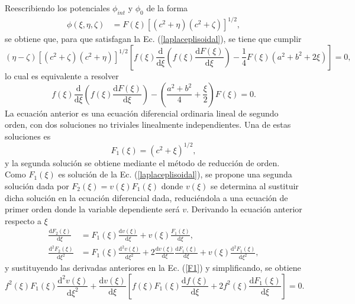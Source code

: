 Reescribiendo los potenciales $\phi_{int}$ y $\phi_0$ de la forma
\begin{align}
    \phi(\xi,\eta,\zeta)&=F(\xi)[(c^2+\eta)(c^2+\zeta)]^{1/2}, 
    \label{phi0 con F}
\end{align}
se obtiene que, para que satisfagan la Ec. (\ref{laplaceplisoidal}), se tiene que cumplir 
\begin{equation}
  (\eta-\zeta)[(c^2+\zeta)(c^2+\eta)]^{1/2}\left[f(\xi)\frac{\text{d}}{\text{d}\xi}\left(f(\xi)\frac{ \text{d} F(\xi)}{\text{d}\xi}\right)-\frac{1}{4}F(\xi)(a^2+b^2+2\xi)\right]=0,
\end{equation}
lo cual es equivalente a resolver
\begin{equation}
    f(\xi)\frac{\text{d}}{\text{d}\xi}\left(f(\xi)\frac{ \text{d} F(\xi)}{\text{d}\xi}\right)-\left(\frac{a^2+b^2}{4}+\frac{\xi}{2}\right)F(\xi)=0.
    \label{ecsimpli}
\end{equation}
La ecuación anterior es una ecuación diferencial ordinaria lineal de segundo orden, con dos soluciones no triviales linealmente independientes. Una de estas soluciones es
\begin{equation}
    F_1(\xi)=(c^2+\xi)^{1/2},
    \label{F1}
\end{equation}
y la segunda solución se obtiene mediante el método de reducción de orden. Como $F_1(\xi)$ es solución de la Ec. (\ref{laplaceplisoidal}), se propone una segunda solución dada por $F_2(\xi)=v(\xi)F_1(\xi)$ donde $v(\xi)$ se determina al sustituir dicha solución en la ecuación diferencial dada, reduciéndola a una ecuación de primer orden donde la variable dependiente será $v$. Derivando la ecuación anterior respecto a $\xi$
\begin{align*}
    \frac{\text{d}F_2(\xi)}{\text{d}\xi}&=F_1(\xi)\frac{\text{d}v(\xi)}{\text{d}\xi}+v(\xi)\frac{F_1(\xi)}{\text{d}\xi},\\
    \frac{\text{d}^2F_2(\xi)}{\text{d}\xi^2}&=F_1(\xi)\frac{\text{d}^2v(\xi)}{\text{d}\xi^2}+2\frac{\text{d}v(\xi)}{\text{d}\xi}\frac{\text{d}F_1(\xi)}{\text{d}\xi}+v(\xi)\frac{\text{d}^2F_1(\xi)}{\text{d}\xi^2},
\end{align*}
y sustituyendo las derivadas anteriores en la Ec. (\ref{F1}) y simplificando, se obtiene
\begin{equation*}
    f^2(\xi)F_1(\xi)\frac{\text{d}^2v(\xi)}{\text{d}\xi^2}+\frac{\text{d}v(\xi)}{\text{d}\xi}\left[f(\xi)F_1(\xi)\frac{\text{d}f(\xi)}{\text{d}\xi}+2f^2(\xi)\frac{\text{d}F_1(\xi)}{\text{d}\xi}\right]=0.
\end{equation*}

